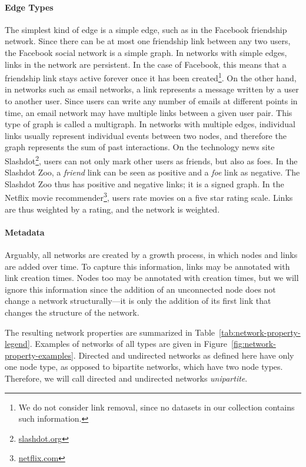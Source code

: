 \documentclass[11pt,a4paper]{book}
\begin{document}
\paragraph{Edge Types}
The simplest kind of edge is a simple edge, such as in the Facebook
friendship network.  Since there can be at most one friendship link
between any two 
users, the Facebook social network is a simple graph.  In networks with
simple edges, links in the network are persistent.  In the case of
Facebook, this means that a friendship link stays active forever once it
has been created\footnote{We do not consider link removal, since no
  datasets in our collection contains such information.}.  
On the other hand, 
in networks such as email networks, a link represents a
message written by a user to another user.  Since users can write any
number of emails at different points in time, an email network may have
multiple links between a given user pair. This type of graph is called a
multigraph. 
In networks with multiple edges, individual links usually represent
individual events between two nodes, and therefore the graph represents
the sum of past interactions. 
On the technology news site
Slashdot\footnote{\href{http://slashdot.org/}{slashdot.org}}, users can
not only mark other users as friends, but also as foes.  In the Slashdot
Zoo, a \emph{friend} link can be seen as positive and a \emph{foe} link
as negative.  The Slashdot Zoo thus has positive and negative links; it
is a signed graph.  In the Netflix movie
recommender\footnote{\href{http://www.netflix.com/}{netflix.com}}, users
rate movies on a five star rating scale.  Links are thus weighted by a
rating, and the network is weighted.  

\paragraph{Metadata}
Arguably, all networks are created by a growth process, in which nodes
and links are added over time. To capture this information, links may be
annotated with link creation times.  Nodes too may be annotated with
creation times, but we will ignore this information since the addition
of an unconnected node does not change a network structurally---it is
only the addition of its first link that changes the structure of the
network. 

The resulting network properties are
summarized in Table~\ref{tab:network-property-legend}.  
Examples of networks of all types are given in
Figure~\ref{fig:network-property-examples}. 
Directed and undirected networks as defined here have only one
node type, as opposed to bipartite networks, which have two node types.
Therefore, we will call directed and undirected networks
\emph{unipartite}.  
\end{document}
